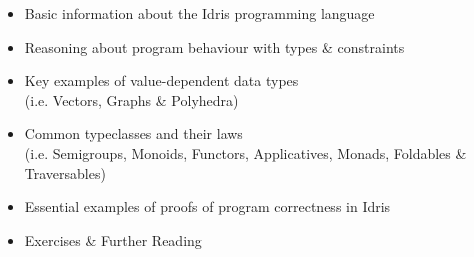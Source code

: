 \begin{itemize}
\item Basic information about the Idris programming language
\item Reasoning about program behaviour with types \& constraints
\item Key examples of value-dependent data types \\
  \small
  (i.e. Vectors, Graphs \& Polyhedra)
  \normalsize
\item Common typeclasses and their laws \\
  \small
  (i.e. Semigroups, Monoids, Functors, Applicatives, Monads, Foldables \& Traversables)
  \normalsize
\item Essential examples of proofs of program correctness in Idris
\item Exercises \& Further Reading
\end{itemize}
